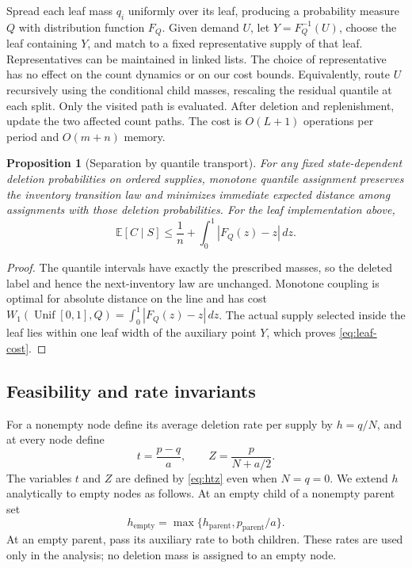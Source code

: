 \documentclass[11pt]{article}
\numberwithin{equation}{section}
\newtheorem{proposition}[theorem]{Proposition}
\theoremstyle{remark}
\newcommand{\E}{\mathbb E}
\newcommand{\Unif}{\operatorname{Unif}}
\newcommand{\Wone}{W_1}
\begin{document}
Spread each leaf mass \(q_i\) uniformly over its leaf, producing a
probability measure \(Q\) with distribution function \(F_Q\). Given demand
\(U\), let \(Y=F_Q^{-1}(U)\), choose the leaf containing \(Y\), and match
to a fixed representative supply of that leaf. Representatives can be
maintained in linked lists. The choice of representative has no effect
on the count dynamics or on our cost bounds.
Equivalently, route \(U\) recursively using the conditional child masses,
rescaling the residual quantile at each split. Only the visited path is
evaluated. After deletion and replenishment, update the two affected
count paths. The cost is \(O(L+1)\) operations per period and \(O(m+n)\)
memory.

\begin{proposition}[Separation by quantile transport]\label{prop:quantile}
For any fixed state-dependent deletion probabilities on ordered supplies,
monotone quantile assignment preserves the inventory transition law and
minimizes immediate expected distance among assignments with those deletion
probabilities. For the leaf implementation above,
\begin{equation}\label{eq:leaf-cost}
\E[C\mid S]
\le\frac1n+\int_0^1|F_Q(z)-z|\,dz.
\end{equation}
\end{proposition}
\begin{proof}
The quantile intervals have exactly the prescribed masses, so the deleted
label and hence the next-inventory law are unchanged. Monotone coupling is
optimal for absolute distance on the line and has cost
\(\Wone(\Unif[0,1],Q)=\int_0^1|F_Q(z)-z|\,dz\). The actual supply selected
inside the leaf lies within one leaf width of the auxiliary point \(Y\),
which proves \eqref{eq:leaf-cost}.
\end{proof}

\subsection{Feasibility and rate invariants}\label{sec:structure}

For a nonempty node define its average deletion rate per supply by \(h=q/N\), and
at every node define
\begin{equation}\label{eq:htz}
t=\frac{p-q}{a},
\qquad
Z=\frac{p}{N+a/2}.
\end{equation}
The variables \(t\) and \(Z\) are defined by \eqref{eq:htz} even when
\(N=q=0\). We extend \(h\) analytically to empty nodes as follows. At an
empty child of a nonempty parent set
\begin{equation}\label{eq:empty-rate}
h_{\mathrm{empty}}
=\max\{h_{\mathrm{parent}},p_{\mathrm{parent}}/a\}.
\end{equation}
At an empty parent, pass its auxiliary rate to both children. These rates
are used only in the analysis; no deletion mass is assigned to an empty
node.
\end{document}
